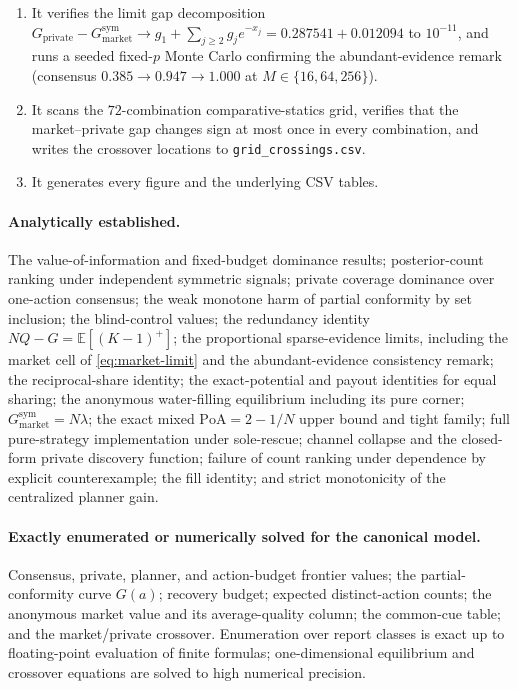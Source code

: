 \documentclass[11pt]{article}
\theoremstyle{definition}
\theoremstyle{remark}
\newcommand{\E}{\mathbb{E}}
\newcommand{\1}{\mathbf{1}}
\newcommand{\priv}{\mathrm{private}}
\newcommand{\mkt}{\mathrm{market}}
\newcommand{\PoA}{\mathrm{PoA}}
\begin{document}
\begin{enumerate}
\item It verifies the limit gap decomposition $G_{\priv}-G_{\mkt}^{\mathrm{sym}}\to g_1+\sum_{j\ge2}g_je^{-x_j}=0.287541+0.012094$ to $10^{-11}$, and runs a seeded fixed-$p$ Monte Carlo confirming the abundant-evidence remark (consensus $0.385\to0.947\to1.000$ at $M\in\{16,64,256\}$).
\item It scans the $72$-combination comparative-statics grid, verifies that the market--private gap changes sign at most once in every combination, and writes the crossover locations to \texttt{grid\_crossings.csv}.
\item It generates every figure and the underlying CSV tables.
\end{enumerate}

\paragraph{Analytically established.}
The value-of-information and fixed-budget dominance results; posterior-count ranking under independent symmetric signals; private coverage dominance over one-action consensus; the weak monotone harm of partial conformity by set inclusion; the blind-control values; the redundancy identity $NQ-G=\E[(K-1)^{+}]$; the proportional sparse-evidence limits, including the market cell of \cref{eq:market-limit} and the abundant-evidence consistency remark; the reciprocal-share identity; the exact-potential and payout identities for equal sharing; the anonymous water-filling equilibrium including its pure corner; $G_{\mkt}^{\mathrm{sym}}=N\lambda$; the exact mixed $\PoA=2-1/N$ upper bound and tight family; full pure-strategy implementation under sole-rescue; channel collapse and the closed-form private discovery function; failure of count ranking under dependence by explicit counterexample; the fill identity; and strict monotonicity of the centralized planner gain.

\paragraph{Exactly enumerated or numerically solved for the canonical model.}
Consensus, private, planner, and action-budget frontier values; the partial-conformity curve $G(a)$; recovery budget; expected distinct-action counts; the anonymous market value and its average-quality column; the common-cue table; and the market/private crossover. Enumeration over report classes is exact up to floating-point evaluation of finite formulas; one-dimensional equilibrium and crossover equations are solved to high numerical precision.
\end{document}
